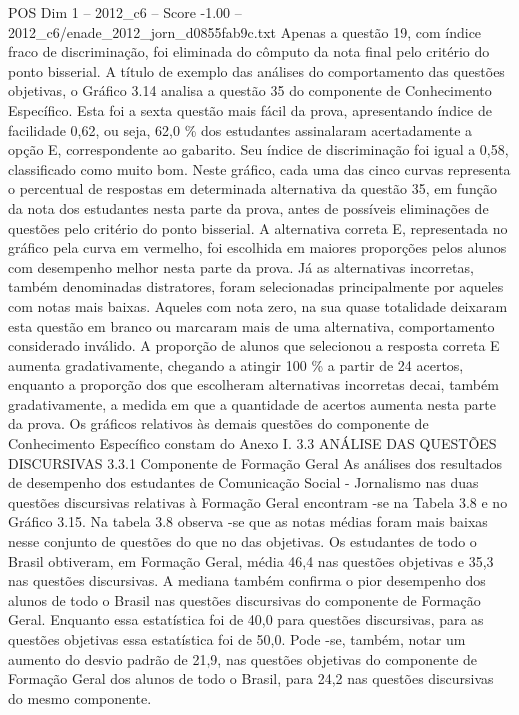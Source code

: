 \begin{textsample}{POS Dim 1 – 2012\_c6 – Score -1.00 – 2012\_c6/enade\_2012\_jorn\_d0855fab9c.txt}
Apenas a questão 19, com índice fraco de discriminação, foi eliminada do cômputo da nota final pelo critério do ponto bisserial.
A título de exemplo das análises do comportamento das questões objetivas, o Gráfico 3.14 analisa a questão 35 do componente de Conhecimento Específico.
Esta foi a sexta questão mais fácil da prova, apresentando índice de facilidade 0,62, ou seja, 62,0 \% dos estudantes assinalaram acertadamente a opção E, correspondente ao gabarito.
Seu índice de discriminação foi igual a 0,58, classificado como muito bom.
Neste gráfico, cada uma das cinco curvas representa o percentual de respostas em determinada alternativa da questão 35, em função da nota dos estudantes nesta parte da prova, antes de possíveis eliminações de questões pelo critério do ponto bisserial.
A alternativa correta E, representada no gráfico pela curva em vermelho, foi escolhida em maiores proporções pelos alunos com desempenho melhor nesta parte da prova.
Já as alternativas incorretas, também denominadas distratores, foram selecionadas principalmente por aqueles com notas mais baixas.
Aqueles com nota zero, na sua quase totalidade deixaram esta questão em branco ou marcaram mais de uma alternativa, comportamento considerado inválido.
A proporção de alunos que selecionou a resposta correta E aumenta gradativamente, chegando a atingir 100 \% a partir de 24 acertos, enquanto a proporção dos que escolheram alternativas incorretas decai, também gradativamente, a medida em que a quantidade de acertos aumenta nesta parte da prova.
Os gráficos relativos às demais questões do componente de Conhecimento Específico constam do Anexo I. 3.3 ANÁLISE DAS QUESTÕES DISCURSIVAS 3.3.1 Componente de Formação Geral As análises dos resultados de desempenho dos estudantes de Comunicação Social - Jornalismo nas duas questões discursivas relativas à Formação Geral encontram -se na Tabela 3.8 e no Gráfico 3.15.
Na tabela 3.8 observa -se que as notas médias foram mais baixas nesse conjunto de questões do que no das objetivas.
Os estudantes de todo o Brasil obtiveram, em Formação Geral, média 46,4 nas questões objetivas e 35,3 nas questões discursivas.
A mediana também confirma o pior desempenho dos alunos de todo o Brasil nas questões discursivas do componente de Formação Geral.
Enquanto essa estatística foi de 40,0 para questões discursivas, para as questões objetivas essa estatística foi de 50,0.
Pode -se, também, notar um aumento do desvio padrão de 21,9, nas questões objetivas do componente de Formação Geral dos alunos de todo o Brasil, para 24,2 nas questões discursivas do mesmo componente.

\end{textsample}
